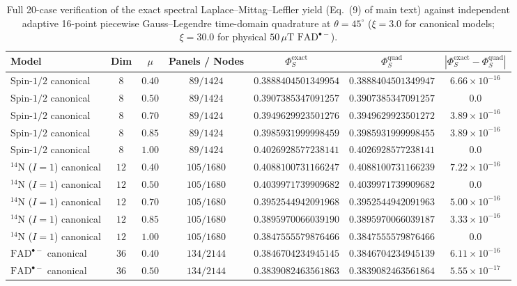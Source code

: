 \documentclass[onecolumn,10pt,notitlepage,amsmath,amssymb,floatfix]{revtex4-2}
\theoremstyle{plain}
\theoremstyle{definition}
\begin{document}
\begin{table}[htbp]
\centering
\caption{Full 20-case verification of the exact spectral Laplace--Mittag--Leffler yield (Eq.~(9) of main text) against independent adaptive 16-point piecewise Gauss--Legendre time-domain quadrature at $\theta = 45^\circ$ ($\xi = 3.0$ for canonical models; $\xi = 30.0$ for physical $50\,\mu\text{T}$ $\mathrm{FAD}^{\bullet-}$).}
\label{tab:S2_laplace_quad}
\setlength{\tabcolsep}{6pt}
\begin{tabular}{@{}lcccccc@{}}
\toprule
Model & Dim & $\mu$ & Panels / Nodes & $\Phi_S^{\mathrm{exact}}$ & $\Phi_S^{\mathrm{quad}}$ & $|\Phi_S^{\mathrm{exact}} - \Phi_S^{\mathrm{quad}}|$ \\
\midrule
Spin-$1/2$ canonical & $8$ & $0.40$ & $89 / 1424$ & $0.3888404501349954$ & $0.3888404501349947$ & $6.66\times 10^{-16}$ \\
Spin-$1/2$ canonical & $8$ & $0.50$ & $89 / 1424$ & $0.3907385347091257$ & $0.3907385347091257$ & $0.0$ \\
Spin-$1/2$ canonical & $8$ & $0.70$ & $89 / 1424$ & $0.3949629923501276$ & $0.3949629923501272$ & $3.89\times 10^{-16}$ \\
Spin-$1/2$ canonical & $8$ & $0.85$ & $89 / 1424$ & $0.3985931999998459$ & $0.3985931999998455$ & $3.89\times 10^{-16}$ \\
Spin-$1/2$ canonical & $8$ & $1.00$ & $89 / 1424$ & $0.4026928577238141$ & $0.4026928577238141$ & $0.0$ \\
\midrule
$^{14}\text{N}$ ($I=1$) canonical & $12$ & $0.40$ & $105 / 1680$ & $0.4088100731166247$ & $0.4088100731166239$ & $7.22\times 10^{-16}$ \\
$^{14}\text{N}$ ($I=1$) canonical & $12$ & $0.50$ & $105 / 1680$ & $0.4039971739909682$ & $0.4039971739909682$ & $0.0$ \\
$^{14}\text{N}$ ($I=1$) canonical & $12$ & $0.70$ & $105 / 1680$ & $0.3952544942091968$ & $0.3952544942091963$ & $5.00\times 10^{-16}$ \\
$^{14}\text{N}$ ($I=1$) canonical & $12$ & $0.85$ & $105 / 1680$ & $0.3895970066039190$ & $0.3895970066039187$ & $3.33\times 10^{-16}$ \\
$^{14}\text{N}$ ($I=1$) canonical & $12$ & $1.00$ & $105 / 1680$ & $0.3847555579876466$ & $0.3847555579876466$ & $0.0$ \\
\midrule
$\mathrm{FAD}^{\bullet-}$ canonical & $36$ & $0.40$ & $134 / 2144$ & $0.3846704234945145$ & $0.3846704234945139$ & $6.11\times 10^{-16}$ \\
$\mathrm{FAD}^{\bullet-}$ canonical & $36$ & $0.50$ & $134 / 2144$ & $0.3839082463561863$ & $0.3839082463561864$ & $5.55\times 10^{-17}$ \\

\end{tabular}
\end{table}
\end{document}
